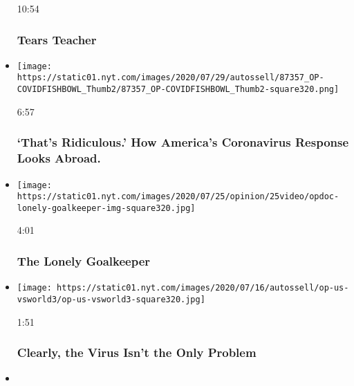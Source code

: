 \begin{itemize}
  10:54

  \hypertarget{tears-teacher}{%
  \subsubsection{Tears Teacher}\label{tears-teacher}}
\item
  \href{https://www.nytimes.com/video/opinion/100000007227777/covid-19-global-response.html?action=click\&module=video-series-bar\&region=header\&pgtype=Article\&playlistId=video/opinion}{}

  \texttt{[image: https://static01.nyt.com/images/2020/07/29/autossell/87357\_OP-COVIDFISHBOWL\_Thumb2/87357\_OP-COVIDFISHBOWL\_Thumb2-square320.png]}

  6:57

  \hypertarget{thats-ridiculous-how-americas-coronavirus-response-looks-abroad}{%
  \subsubsection{`That's Ridiculous.' How America's Coronavirus Response
  Looks
  Abroad.}\label{thats-ridiculous-how-americas-coronavirus-response-looks-abroad}}
\item
  \href{https://www.nytimes.com/video/opinion/100000007229285/the-lonely-goalkeeper.html?action=click\&module=video-series-bar\&region=header\&pgtype=Article\&playlistId=video/opinion}{}

  \texttt{[image: https://static01.nyt.com/images/2020/07/25/opinion/25video/opdoc-lonely-goalkeeper-img-square320.jpg]}

  4:01

  \hypertarget{the-lonely-goalkeeper}{%
  \subsubsection{The Lonely Goalkeeper}\label{the-lonely-goalkeeper}}
\item
  \href{https://www.nytimes.com/video/opinion/100000007242791/coronavirus-response-america.html?action=click\&module=video-series-bar\&region=header\&pgtype=Article\&playlistId=video/opinion}{}

  \texttt{[image: https://static01.nyt.com/images/2020/07/16/autossell/op-us-vsworld3/op-us-vsworld3-square320.jpg]}

  1:51

  \hypertarget{clearly-the-virus-isnt-the-only-problem}{%
  \subsubsection{Clearly, the Virus Isn't the Only
  Problem}\label{clearly-the-virus-isnt-the-only-problem}}
\item
  \href{https://www.nytimes.com/video/opinion/100000007227771/coronavirus-covid-brazil-bolsonaro.html?action=click\&module=video-series-bar\&region=header\&pgtype=Article\&playlistId=video/opinion}{}


\end{itemize}
